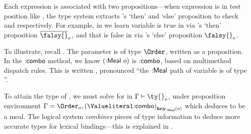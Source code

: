 Each expression is associated with two propositions---when expression
 is in test position like
,
the type system extracts 's `then' and `else' proposition to check
 and  respectively.
For example, in 
we learn variable {} is true in  via {}'s `then' proposition $\notprop{\falsy{}}{\makelocal{o}}$, and 
that {} is false in  via {}'s `else' proposition $\isprop{\falsy{}}{\makelocal{o}}$.

To illustrate, recall .
The parameter  is of type $\Order$,
written
{}
as a proposition.
%
In the ${{\mathsf{\mathbin{:}combo}}}$ method, we know
${({\mathsf{\mathbin{:}Meal}}\ o)}$ is ${{\mathsf{\mathbin{:}combo}}}$,
based on multimethod dispatch rules. This is written
  {},
pronounced ``the ${{\mathsf{\mathbin{:}Meal}}}$ path of variable  is of type
{}''.

To attain the type of , 
we must solve for \ty{} in
$
{ \inpropenv 
  {\propenv{}}
  {\isprop {\ty{}} {\makelocal{o}}}}
$,
under proposition environment
$
\propenv{} = {{\isprop{\Order}{\makelocal{o}}},
    {\isprop{\Value{\makekw{combo}}}{\pth{\keype{\makekw{Meal}}}{\makelocal{o}}}}}
$
which deduces \ty{} to be a {} meal.
The logical
system \emph{combines} pieces of type information to deduce more accurate types for lexical
bindings---this is explained in .

%





